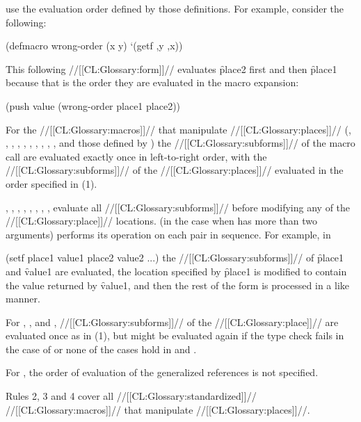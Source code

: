 use the evaluation order defined by those definitions.
For example, consider the following:

\code
 (defmacro wrong-order (x y) `(getf ,y ,x))
\endcode

This following //[[CL:Glossary:form]]// evaluates \f{place2} first and
then \f{place1} because that is the order they are evaluated in
the macro expansion:

\code
 (push value (wrong-order place1 place2))
\endcode

For the //[[CL:Glossary:macros]]// that manipulate //[[CL:Glossary:places]]// 
  (,
   ,
   ,
   ,
   , 
   ,
   ,
   ,
   ,
   , and those defined by )
the //[[CL:Glossary:subforms]]// of the macro call are evaluated exactly once
in left-to-right order, with the //[[CL:Glossary:subforms]]// of the //[[CL:Glossary:places]]//
evaluated in the order specified in (1).


, , , 
, , , , 
,  evaluate all //[[CL:Glossary:subforms]]// before modifying
any of the //[[CL:Glossary:place]]// locations.
 (in the case when  has more than two arguments) 
performs its operation on each pair in sequence. For example, in 

\code
 (setf place1 value1 place2 value2 ...)
\endcode
the //[[CL:Glossary:subforms]]// of \f{place1} and \f{value1} are evaluated, the location
specified by 
\f{place1} is modified to contain the value returned by 
\f{value1}, and
then the rest of the  form is processed in a like manner.

For , , and ,
//[[CL:Glossary:subforms]]// of the //[[CL:Glossary:place]]// are evaluated once as in (1),
but might be evaluated again if the
type check fails in the case of  
or none of the cases hold in
 and .

For , the order of evaluation of the generalized 
references is not specified.



\endlist
Rules 2, 3 and 4 cover all //[[CL:Glossary:standardized]]// //[[CL:Glossary:macros]]// that manipulate //[[CL:Glossary:places]]//.

